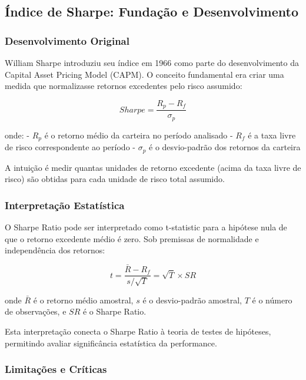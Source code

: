 \subsection{Índice de Sharpe: Fundação e Desenvolvimento}

\subsubsection{Desenvolvimento Original}

William Sharpe introduziu seu índice em 1966 como parte do desenvolvimento da Capital Asset Pricing Model (CAPM). O conceito fundamental era criar uma medida que normalizasse retornos excedentes pelo risco assumido:

\begin{equation}
Sharpe = \frac{R_p - R_f}{\sigma_p}
\end{equation}

onde:
- $R_p$ é o retorno médio da carteira no período analisado
- $R_f$ é a taxa livre de risco correspondente ao período
- $\sigma_p$ é o desvio-padrão dos retornos da carteira

A intuição é medir quantas unidades de retorno excedente (acima da taxa livre de risco) são obtidas para cada unidade de risco total assumido.

\subsubsection{Interpretação Estatística}

O Sharpe Ratio pode ser interpretado como t-statistic para a hipótese nula de que o retorno excedente médio é zero. Sob premissas de normalidade e independência dos retornos:

\begin{equation}
t = \frac{\bar{R} - R_f}{s/\sqrt{T}} = \sqrt{T} \times SR
\end{equation}

onde $\bar{R}$ é o retorno médio amostral, $s$ é o desvio-padrão amostral, $T$ é o número de observações, e $SR$ é o Sharpe Ratio.

Esta interpretação conecta o Sharpe Ratio à teoria de testes de hipóteses, permitindo avaliar significância estatística da performance.

\subsubsection{Limitações e Críticas}

